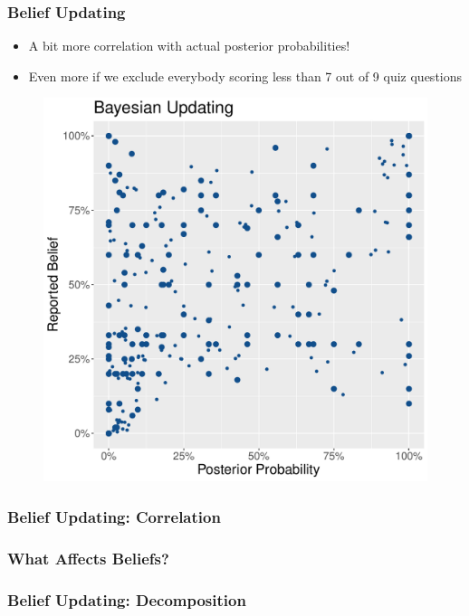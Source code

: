 \documentclass[11pt,hyperref={bookmarks=false}]{beamer}
\begin{document}
\begin{frame}
\frametitle{Belief Updating}
\begin{itemize}
\item A bit more correlation with actual posterior probabilities!
\item Even more if we exclude everybody scoring less than 7 out of 9 quiz questions
\end{itemize}
\begin{figure}[h]
\includegraphics[scale=0.4]{Graphs/UPD_curve2.pdf}
\end{figure}
\end{frame}


\begin{frame}
\frametitle{Belief Updating: Correlation}
\footnotesize


\end{frame}

\begin{frame}
\frametitle{What Affects Beliefs?}
\footnotesize

\end{frame}


\begin{frame}
\frametitle{Belief Updating: Decomposition}
\footnotesize

\end{frame}
\end{document}
